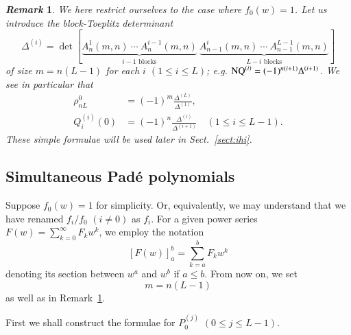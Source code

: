 \documentclass[12pt]{article}
\newtheorem{remark}[thm]{\it Remark}
\numberwithin{equation}{section}
\begin{document}
\begin{remark}\rm
\label{remark:bT}
We here restrict ourselves to the case where $f_0(w)=1$. 
Let us introduce the {\it block-Toeplitz determinant}
\[
\Delta^{(i)}
=
\det
 \left[
\underbrace{
A^1_{n}( m,  n) \
\cdots  \
A^{i-1}_{n}(m,  n)}_{\text{$i-1$ blocks}}
 \
\underbrace{
A^{i}_{n-1}(m,  n)  \
\cdots   \  
A^{L-1}_{n-1}(m,  n)
}_{\text{$L-i$ blocks}}
\right]
\]
of size $m=n(L-1)$
for each $i$ $(1 \leq i \leq L)$;
e.g.
${\rm NQ}^{(i)}
=(-1)^{n(i+1)} \Delta^{(i+1)}$.
We see in particular that 
\begin{align*}
\rho^0_{nL}
&=(-1)^m \frac{\Delta^{(L)}}{\Delta^{(1)}},
\\
Q_i^{(i)}(0)
&=(-1)^n
\frac{\Delta^{(i)}}{\Delta^{(i+1)}}
\quad (1 \leq i \leq L-1).
\end{align*}
These simple formulae will be used later in Sect.~\ref{sect:ihi}.
\end{remark}





\subsection{Simultaneous Pad\'e polynomials}
\label{subsect:detspa}


Suppose $f_0(w) = 1$ for simplicity.
Or, equivalently, we may understand that
we have renamed $f_i/f_0$ $(i \neq 0)$ as $f_i$.
For a given power series $F(w)=\sum_{k=0}^\infty  F_k w ^k$,
we employ the notation
\[
\left[  F(w)  \right]^{b}_{a}
=\sum_{k=a}^b  F_k w ^k
\]
denoting its section between $w^a$ and $w^b$ if $a \leq b$.
From now on, 
we set
\[m=n(L-1)
\] 
as well as in Remark~\ref{remark:bT}.


First
we shall construct the formulae for  $P_0^{(j)}$ $(0 \leq j \leq L-1)$.
\end{document}
